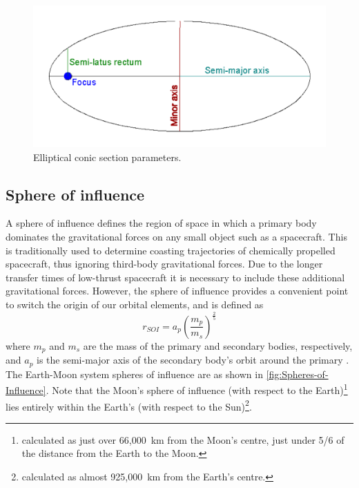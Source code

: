 \begin{figure}[h]
\begin{center}
\includegraphics[scale=0.35]{Images/ellipse_parameters.pdf}
\end{center}
\caption{Elliptical conic section parameters.}
\label{fig:Elliptical-Conic-Section}
\end{figure}

\subsection{Sphere of influence}\label{sub:SOI}
A sphere of influence defines the region of space in which a primary body dominates the gravitational forces on any small object such as a spacecraft. This is traditionally used to determine coasting trajectories of chemically propelled spacecraft, thus ignoring third-body gravitational forces. Due to the longer transfer times of low-thrust spacecraft it is necessary to include these additional gravitational forces. However, the sphere of influence provides a convenient point to switch the origin of our orbital elements, and is defined as
\begin{equation}
r_{SOI}=a_{p}\left(\frac{m_{p}}{m_{s}}\right)^{\frac{2}{5}} \label{eq:SOI}
\end{equation}
where $m_{p}$ and $m_{s}$ are the mass of the primary and secondary bodies, respectively, and $a_{p}$ is the semi-major axis of the secondary body's orbit around the primary \parencite{Kemble2006}. The Earth-Moon system spheres of influence are as shown in \autoref{fig:Spheres-of-Influence}.
 Note that the Moon's sphere of influence (with respect to the Earth)\footnote{calculated as just over 66,000~km from the Moon's centre, just under 5/6 of the distance from the Earth to the Moon.} lies entirely within the Earth's (with respect to the Sun)\footnote{calculated as almost 925,000~km from the Earth's centre.}.


